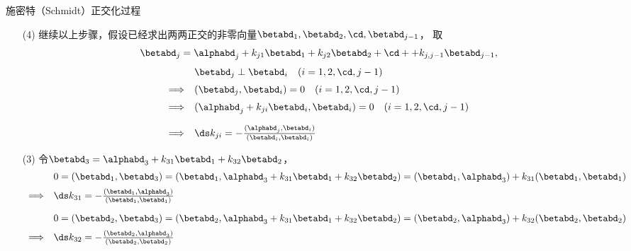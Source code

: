 \begin{frame}
  \begin{footnotesize}
    \begin{block}{施密特（Schmidt）正交化过程}
      
      \begin{itemize}
      \item[(4)] 继续以上步骤，假设已经求出两两正交的非零向量$\betabd_1,\betabd_2,\cd,\betabd_{j-1}$，
        取
        $$\betabd_j=\alphabd_j+k_{j1}\betabd_1+k_{j2}\betabd_2+\cd++k_{j,j-1}\betabd_{j-1},
        $$
        $$
        \begin{array}{rl}
          & \betabd_j \perp \betabd_i\quad (i=1,2,\cd,j-1)\\[0.2cm]
          \Longrightarrow &(\betabd_j,\betabd_i)=0 \quad (i=1,2,\cd,j-1)\\[0.2cm]
          \Longrightarrow &(\alphabd_j+k_{ji}\betabd_i,\betabd_i)=0 \quad (i=1,2,\cd,j-1)\\[0.4cm]
          \Longrightarrow& \ds k_{ji}=-\frac{(\alphabd_j,\betabd_i)}{(\betabd_i,\betabd_i)}
        \end{array}
        $$
      \item[(3)] 令$\betabd_3=\alphabd_3+k_{31}\betabd_1+k_{32}\betabd_2$，
        $$
        \begin{array}{rl}
          &0=(\betabd_1,\betabd_3)=(\betabd_1,\alphabd_3+k_{31}\betabd_1+k_{32}\betabd_2)=(\betabd_1,\alphabd_3)+k_{31}(\betabd_1,\betabd_1)\\[0.2cm]
          \Longrightarrow& \ds k_{31}=-\frac{(\betabd_1,\alphabd_3)}{(\betabd_1,\betabd_1)}\\[0.4cm]
          &0=(\betabd_2,\betabd_3)=(\betabd_2,\alphabd_3+k_{31}\betabd_1+k_{32}\betabd_2)=(\betabd_2,\alphabd_3)+k_{32}(\betabd_2,\betabd_2)\\[0.2cm]
          \Longrightarrow& \ds k_{32}=-\frac{(\betabd_2,\alphabd_3)}{(\betabd_2,\betabd_2)}
        \end{array}
        $$
      \end{itemize}
    \end{block}
  \end{footnotesize}
\end{frame}


\begin{frame}
  \begin{footnotesize}
    
  \end{footnotesize}
\end{frame}


\begin{frame}
  \begin{footnotesize}
    
  \end{footnotesize}
\end{frame}


\begin{frame}
  \begin{footnotesize}
    
  \end{footnotesize}
\end{frame}
